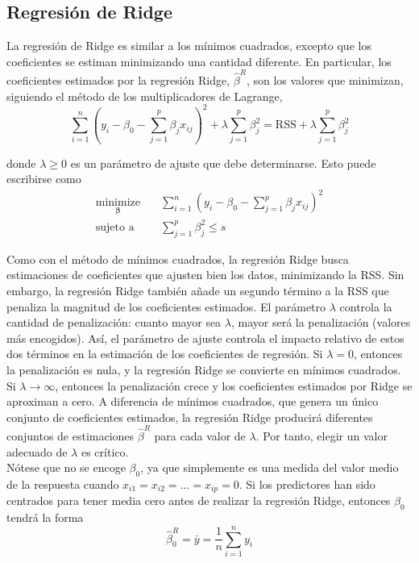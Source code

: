 \subsection{Regresión de Ridge}

La regresión de Ridge es similar a los mínimos cuadrados, excepto que los coeficientes se estiman minimizando una cantidad diferente. En particular, los coeficientes estimados por la regresión Ridge, $\hat{\beta}^R$, son los valores que minimizan, siguiendo el método de los multiplicadores de Lagrange, 
\begin{equation}
\sum_{i=1}^{n}\left(y_i - \beta_0 - \sum_{j=1}^{p}\beta_j x_{ij}\right)^2 + \lambda\sum_{j=1}^{p}\beta_j^2 = \text{RSS} + \lambda\sum_{j=1}^{p}\beta_j^2
\label{eq:6.5}
\end{equation}

\noindent donde $\lambda \geq 0$ es un parámetro de ajuste que debe determinarse. Esto puede escribirse como 
\begin{align}
\underset{\boldsymbol{\beta}}{\text{minimize}} \quad &\sum_{i=1}^{n}\left(y_i - \beta_0 - \sum_{j=1}^{p}\beta_j x_{ij}\right)^2 \\
\text{sujeto a} \quad &\sum_{j=1}^{p}\beta_j^2 \leq s \label{eq:6.8}
\end{align}

Como con el método de mínimos cuadrados, la regresión Ridge busca estimaciones de coeficientes que ajusten bien los datos, minimizando la RSS. Sin embargo, la regresión Ridge también añade un segundo término a la RSS que penaliza la magnitud de los coeficientes estimados. El parámetro $\lambda$ controla la cantidad de penalización: cuanto mayor sea $\lambda$, mayor será la penalización (valores más encogidos). Así, el parámetro de ajuste controla el impacto relativo de estos dos términos en la estimación de los coeficientes de regresión. Si $\lambda = 0$, entonces la penalización es nula, y la regresión Ridge se convierte en mínimos cuadrados. Si $\lambda \to \infty$, entonces la penalización crece y los coeficientes estimados por Ridge se aproximan a cero. A diferencia de mínimos cuadrados, que genera un único conjunto de coeficientes estimados, la regresión Ridge producirá diferentes conjuntos de estimaciones $\hat{\beta}^R$ para cada valor de $\lambda$. Por tanto, elegir un valor adecuado de $\lambda$ es crítico. \\

Nótese que no se encoge $\beta_0$, ya que simplemente es una medida del valor medio de la respuesta cuando $x_{i1} = x_{i2} = \dots = x_{ip} = 0$. Si los predictores han sido centrados para tener media cero antes de realizar la regresión Ridge, entonces $\beta_0$ tendrá la forma 
\begin{equation}
\hat{\beta}_0^R = \bar{y} = \frac{1}{n}\sum_{i=1}^{n}y_i
\end{equation}

